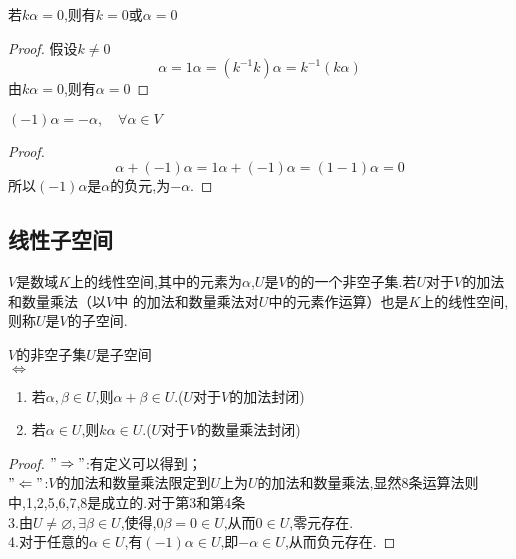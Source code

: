 \documentclass[blue,normal,cn]{elegantnote}
\begin{document}
\begin{theorem}
\begin{property}
   若$kα=0$,则有$k=0$或$α=0$
\end{property}

\begin{proof}
    假设$k≠ 0$
    \begin{equation*}
        α=1α=(k^{-1}k)α=k^{-1}(kα)
    \end{equation*}
    由$kα=0$,则有$α=0$
\end{proof}


\begin{property}
    $(-1)α=-α,\quad \forall α ∈ V$
 \end{property}
 
 \begin{proof}
     \begin{equation*}
         α+(-1)α=1α+(-1)α=(1-1)α=0
     \end{equation*}
     所以$(-1)α$是$α$的负元,为$-α$.
 \end{proof}

\subsection{线性子空间}
\begin{definition}
$V$是数域$K$上的线性空间,其中的元素为$α$,$U$是$V$的的一个非空子集.若$U$对于$V$的加法和数量乘法（以$V$中
的加法和数量乘法对$U$中的元素作运算）也是$K$上的线性空间,
则称$U$是$V$的子空间.
\end{definition}

\begin{theorem}
$V$的非空子集$U$是子空间 \\
$\Longleftrightarrow$
    \begin{enumerate}
        \item 若$α,β ∈ U$,则$α+β ∈ U$.($U$对于$V$的加法封闭)
        \item 若$α ∈ U$,则$kα ∈ U$.($U$对于$V$的数量乘法封闭)
    \end{enumerate}
\end{theorem}

\begin{proof}
$"\Rightarrow"$:有定义可以得到；\\
$"\Leftarrow"$:$V$的加法和数量乘法限定到$U$上为$U$的加法和数量乘法,显然8条运算法则中,1,2,5,6,7,8是成立的.对于第3和第4条
\\3.由$U≠ \varnothing,\exists β ∈ U$,使得,$0β=0 ∈ U$,从而$0 ∈ U$,零元存在.\\
4.对于任意的$α ∈ U$,有$(-1)α ∈ U$,即$-α ∈ U$,从而负元存在.
\end{proof}


\end{theorem}
\end{document}
